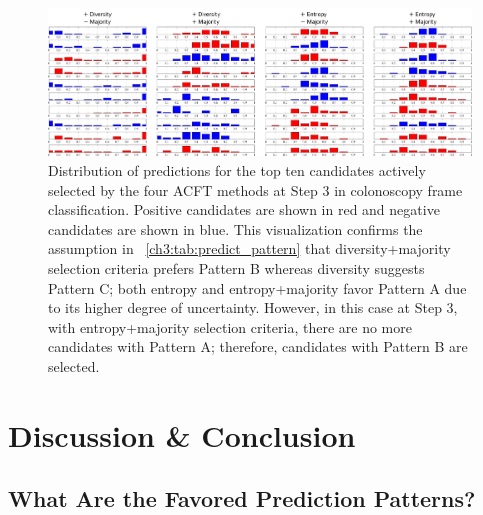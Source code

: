 \begin{figure}
\footnotesize
\begin{center}
  \includegraphics[width=1.0\columnwidth]{Figures/CH3/fig_predicted_distribution.pdf}
\end{center}
\caption[Prediction Distribution of Top Candidates]{
Distribution of predictions for the top ten candidates actively selected by the four ACFT methods at Step 3 in colonoscopy frame classification. Positive candidates are shown in red and negative candidates are shown in blue. This visualization confirms the assumption in \tableautorefname~\ref{ch3:tab:predict_pattern} that diversity+majority selection criteria prefers Pattern B whereas diversity suggests Pattern C; both entropy and entropy+majority favor Pattern A due to its higher degree of uncertainty. However, in this case at Step 3, with entropy+majority selection criteria, there are no more candidates with Pattern A; therefore, candidates with Pattern B are selected.
}
\label{ch3:fig:predicted_distribution}
\end{figure}


\section{Discussion \& Conclusion}
\label{ch3:discussion_conclusion}



\subsection{What Are the Favored Prediction Patterns?}
\label{ch3:discussion_conclusion:favored_prediction_patterns}

